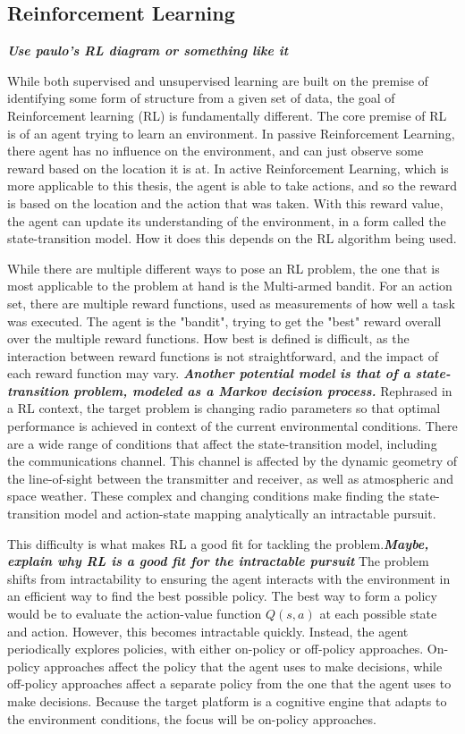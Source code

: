 	\subsection{Reinforcement Learning}
	\textbf{\textit{Use paulo's RL diagram or something like it}}
	\par While both supervised and unsupervised learning are built on the premise of identifying some form of structure from a given set of data, the goal of Reinforcement learning (RL) is fundamentally different. The core premise of RL is of an agent trying to learn an environment. In passive Reinforcement Learning, there agent has no influence on the environment, and can just observe some reward based on the location it is at. In active Reinforcement Learning, which is more applicable to this thesis, the agent is able to take actions, and so the reward is based on the location and the action that was taken. With this reward value, the agent can update its understanding of the environment, in a form called the state-transition model. How it does this depends on the RL algorithm being used.
	\par While there are multiple different ways to pose an RL problem, the one that is most applicable to the problem at hand is the Multi-armed bandit. For an action set, there are multiple reward functions, used as measurements of how well a task was executed. 
	The agent is the "bandit", trying to get the "best" reward overall over the multiple reward functions. How best is defined is difficult, as the interaction between reward functions is not straightforward, and the impact of each reward function may vary. 
	 \textbf{\textit{Another potential model is that of a state-transition problem, modeled as a Markov decision process.}} Rephrased in a RL context, the target problem is changing radio parameters so that optimal performance is achieved in context of the current environmental conditions. There are a wide range of conditions that affect the state-transition model, including the communications channel. This channel is affected by the dynamic geometry of the line-of-sight between the transmitter and receiver, as well as atmospheric and space weather. These complex and changing conditions make finding the state-transition model and action-state mapping analytically an intractable pursuit. 
	\par This difficulty is what makes RL a good fit for tackling the problem.\textbf{\textit{Maybe, explain why RL is a good fit for the intractable pursuit}} The problem shifts from intractability to ensuring the agent interacts with the environment in an efficient way to find the best possible policy. The best way to form a policy would be to evaluate the action-value function $Q(s,a)$ at each possible state and action. However, this becomes intractable quickly. Instead, the agent periodically explores policies, with either on-policy or off-policy approaches. On-policy approaches affect the policy that the agent uses to make decisions, while off-policy approaches affect a separate policy from the one that the agent uses to make decisions. Because the target platform is a cognitive engine that adapts to the environment conditions, the focus will be on-policy approaches. 
